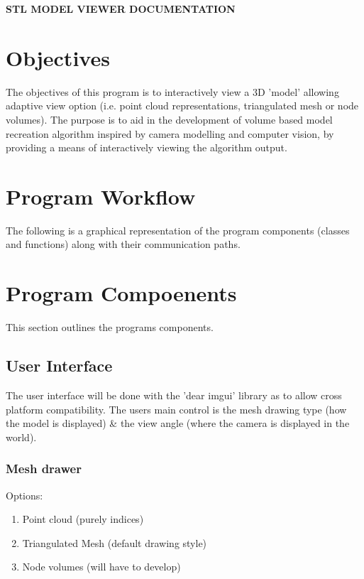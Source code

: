 \documentclass[11pt]{article}
\begin{document}
	{\huge{\uppercase{\textbf{STL model viewer documentation}}}} \\ 
	\section{Objectives}
		The objectives of this program is to  interactively view a 3D 'model' allowing adaptive view option (i.e. point cloud representations, triangulated mesh or node volumes). The purpose is to aid in the development of volume based model recreation algorithm inspired by camera modelling and computer vision, by providing a means of interactively viewing the algorithm output. 
		
	\section{Program Workflow}
		The following is a graphical representation of the program components (classes and functions) along with their communication paths. 
		\begin{tikzpicture}
		\end{tikzpicture}
		
	\section{Program Compoenents}
		This section outlines the programs components. 
		
		\subsection{User Interface} 
			The user interface will be done with the 'dear imgui' library as to allow cross platform compatibility. The users main control is the mesh drawing type (how the model is displayed) \& the view angle (where the camera is displayed in the world). 
		
			\subsubsection{Mesh drawer}
				Options: 
					\begin{enumerate}
						\setlength{\itemsep}{0cm}
						\item Point cloud (purely indices)
						\item Triangulated Mesh (default drawing style)
						\item Node volumes (will have to develop)
					\end{enumerate}
		
\end{document}
